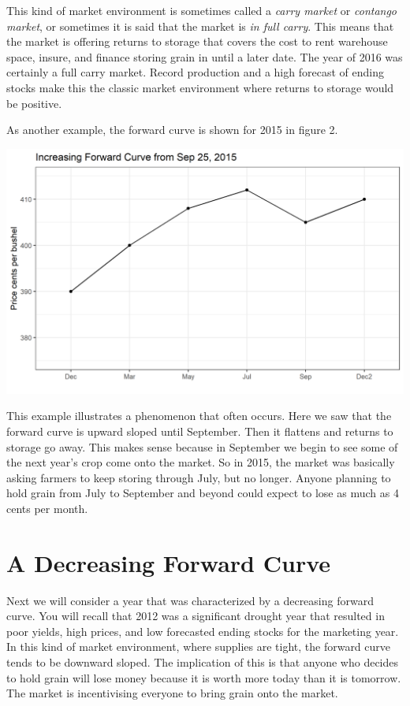 \documentclass[
  letterpaper,
  DIV=11,
  numbers=noendperiod]{scrreprt}
\begin{document}
This kind of market environment is sometimes called a \emph{carry
market} or \emph{contango market}, or sometimes it is said that the
market is \emph{in full carry}. This means that the market is offering
returns to storage that covers the cost to rent warehouse space, insure,
and finance storing grain in until a later date. The year of 2016 was
certainly a full carry market. Record production and a high forecast of
ending stocks make this the classic market environment where returns to
storage would be positive.

As another example, the forward curve is shown for 2015 in figure 2.

\includegraphics{assets/PricesSpaceTime-increasing-9-25-2015.png}

This example illustrates a phenomenon that often occurs. Here we saw
that the forward curve is upward sloped until September. Then it
flattens and returns to storage go away. This makes sense because in
September we begin to see some of the next year's crop come onto the
market. So in 2015, the market was basically asking farmers to keep
storing through July, but no longer. Anyone planning to hold grain from
July to September and beyond could expect to lose as much as 4 cents per
month.

\section{A Decreasing Forward Curve}\label{a-decreasing-forward-curve}

Next we will consider a year that was characterized by a decreasing
forward curve. You will recall that 2012 was a significant drought year
that resulted in poor yields, high prices, and low forecasted ending
stocks for the marketing year. In this kind of market environment, where
supplies are tight, the forward curve tends to be downward sloped. The
implication of this is that anyone who decides to hold grain will lose
money because it is worth more today than it is tomorrow. The market is
incentivising everyone to bring grain onto the market.
\end{document}
